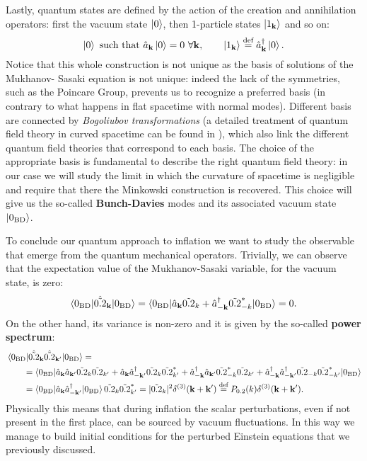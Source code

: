 Lastly, quantum states are defined by the action of the creation and annihilation operators: first the vacuum state $\ket{0}$, then 1-particle states $\ket{1_\mathbf{k}}$ and so on:
\begin{equation}
    \ket{0}\text{ such that }\hat{a}_\mathbf{k}\ket{0}=0\ \forall \mathbf{k},\qquad \ket{1_\mathbf{k}}\stackrel{\text{def}}{=}\hat{a}^\dagger_\mathbf{k}\ket{0}.
\end{equation}
Notice that this whole construction is not unique as the basis of solutions of the Mukhanov- Sasaki equation is not unique: indeed the lack of the symmetries, such as the Poincare Group, prevents us to recognize a preferred basis (in contrary to what happens in flat spacetime with normal modes). Different basis are connected by \emph{Bogoliubov transformations} (a detailed treatment of quantum field theory in curved spacetime can be found in \cite{Birrell:1982ix}), which also link the different quantum field theories that correspond to each basis. The choice of the appropriate basis is fundamental to describe the right quantum field theory: in our case we will study the limit in which the curvature  of spacetime is negligible and require that there the Minkowski construction is recovered. This choice will give us the so-called \textbf{Bunch-Davies} modes and its associated vacuum state $\ket{0_\text{BD}}$.

To conclude our quantum approach to inflation we want to study the observable that emerge from the quantum mechanical operators. Trivially, we can observe that the expectation value of the Mukhanov-Sasaki variable, for the vacuum state, is zero:
$$\braket{0_\text{BD}|\hat{\tilde{0.2}}_\mathbf{k}|0_\text{BD}}=\braket{0_\text{BD}|\hat a_{\mathbf k}\tilde{0.2}_k+\hat a_{-\mathbf k}^{\dagger}\tilde{0.2}^*_{-k}|0_\text{BD}}=0.$$
On the other hand, its variance is non-zero and it is given by the so-called \textbf{power spectrum}:
\begin{align*}
   &\braket{0_\text{BD}|\hat{\tilde{0.2}}_\mathbf{k}\hat{\tilde{0.2}}_\mathbf{k'}|0_\text{BD}}=\\ &\qquad=\braket{0_\text{BD}|\hat a_{\mathbf k}\hat a_{\mathbf k'}\tilde{0.2}_k \tilde{0.2}_{k'}+\hat a_{\mathbf k}\hat a_{-\mathbf k'}^{\dagger}\tilde{0.2}_{k} \tilde{0.2}^*_{k'}+\hat a_{-\mathbf k}^{\dagger}\hat a_{\mathbf k'}\tilde{0.2}_{-k}^* \tilde{0.2}_{k'}+\hat a_{-\mathbf k}^\dagger\hat a_{-\mathbf k'}^{\dagger}\tilde{0.2}_{-k} \tilde{0.2}^*_{-k'}|0_\text{BD}}\\&\qquad=\braket{0_\text{BD}|\hat a_{\mathbf k}\hat a_{-\mathbf k'}^{\dagger}|0_\text{BD}}\tilde{0.2}_{k} \tilde{0.2}^*_{k'}=|\tilde{0.2}_{k}|^2\delta^{(3)}(\mathbf{k+k'})\stackrel{\text{def}}{=}{P}_{0.2}(k)\delta^{(3)}(\mathbf{k+k'}).
\end{align*} 
Physically this means that during inflation the scalar perturbations, even if not present in the first place, can be sourced by vacuum fluctuations. In this way we manage to build initial conditions for the perturbed Einstein equations that we previously discussed.

